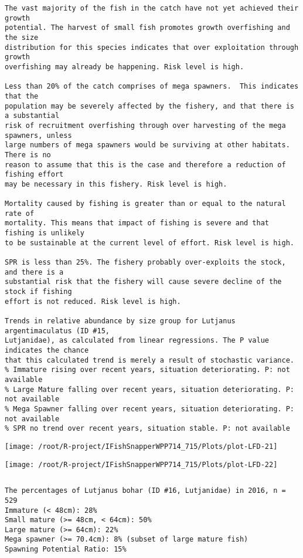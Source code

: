 \documentclass{report}\usepackage[]{graphicx}\usepackage[]{color}
\makeatletter
\def\maxwidth{ %
  \ifdim\Gin@nat@width>\linewidth
    \linewidth
  \else
    \Gin@nat@width
  \fi
}
\newenvironment{kframe}{%
 \def\at@end@of@kframe{}%
 \ifinner\ifhmode%
  \def\at@end@of@kframe{\end{minipage}}%
  \begin{minipage}{\columnwidth}%
 \fi\fi%
 \def\FrameCommand##1{\hskip\@totalleftmargin \hskip-\fboxsep
 \colorbox{shadecolor}{##1}\hskip-\fboxsep
     \hskip-\linewidth \hskip-\@totalleftmargin \hskip\columnwidth}%
 \MakeFramed {\advance\hsize-\width
   \@totalleftmargin\z@ \linewidth\hsize
   \@setminipage}}%
 {\par\unskip\endMakeFramed%
 \at@end@of@kframe}
\newenvironment{knitrout}{}{} %
\makeatother
\begin{document}
\begin{knitrout}
\begin{kframe}
\begin{verbatim}
The vast majority of the fish in the catch have not yet achieved their growth
potential. The harvest of small fish promotes growth overfishing and the size
distribution for this species indicates that over exploitation through growth
overfishing may already be happening. Risk level is high.

Less than 20% of the catch comprises of mega spawners.  This indicates that the
population may be severely affected by the fishery, and that there is a substantial
risk of recruitment overfishing through over harvesting of the mega spawners, unless
large numbers of mega spawners would be surviving at other habitats. There is no
reason to assume that this is the case and therefore a reduction of fishing effort
may be necessary in this fishery. Risk level is high.
 
Mortality caused by fishing is greater than or equal to the natural rate of
mortality. This means that impact of fishing is severe and that fishing is unlikely
to be sustainable at the current level of effort. Risk level is high.
 
SPR is less than 25%. The fishery probably over-exploits the stock, and there is a
substantial risk that the fishery will cause severe decline of the stock if fishing
effort is not reduced. Risk level is high.
 
Trends in relative abundance by size group for Lutjanus argentimaculatus (ID #15,
Lutjanidae), as calculated from linear regressions. The P value indicates the chance
that this calculated trend is merely a result of stochastic variance.
% Immature rising over recent years, situation deteriorating. P: not available
% Large Mature falling over recent years, situation deteriorating. P: not available
% Mega Spawner falling over recent years, situation deteriorating. P: not available
% SPR no trend over recent years, situation stable. P: not available
\end{verbatim}
\end{kframe}
\texttt{[image: /root/R-project/IFishSnapperWPP714\_715/Plots/plot-LFD-21]} 

\texttt{[image: /root/R-project/IFishSnapperWPP714\_715/Plots/plot-LFD-22]} 
\begin{kframe}\begin{verbatim}
\end{verbatim}
\end{kframe}
\clearpage
\newpage
\begin{kframe}\begin{verbatim}The percentages of Lutjanus bohar (ID #16, Lutjanidae) in 2016, n = 529
Immature (< 48cm): 28%
Small mature (>= 48cm, < 64cm): 50%
Large mature (>= 64cm): 22%
Mega spawner (>= 70.4cm): 8% (subset of large mature fish)
Spawning Potential Ratio: 15%
 

\end{verbatim}
\end{kframe}
\end{knitrout}
\end{document}
